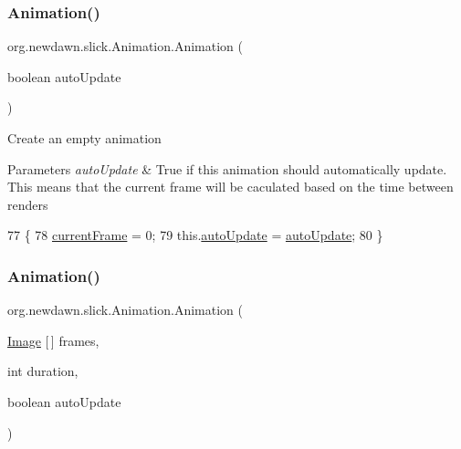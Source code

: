\subsubsection{\texorpdfstring{Animation()}{Animation()}\hspace{0.1cm}{\footnotesize\ttfamily [4/9]}}
{\footnotesize\ttfamily org.\+newdawn.\+slick.\+Animation.\+Animation (\begin{DoxyParamCaption}\item[{boolean}]{auto\+Update }\end{DoxyParamCaption})\hspace{0.3cm}{\ttfamily [inline]}}

Create an empty animation


\begin{DoxyParams}{Parameters}
{\em auto\+Update} & True if this animation should automatically update. This means that the current frame will be caculated based on the time between renders \\
\hline
\end{DoxyParams}

\begin{DoxyCode}
77                                          \{
78         \mbox{\hyperlink{classorg_1_1newdawn_1_1slick_1_1_animation_a358e1f2b9d9a05f83a416405e6bcd332}{currentFrame}} = 0;
79         this.\mbox{\hyperlink{classorg_1_1newdawn_1_1slick_1_1_animation_a343dbff14a050cf8753e9a67746deede}{autoUpdate}} = \mbox{\hyperlink{classorg_1_1newdawn_1_1slick_1_1_animation_a343dbff14a050cf8753e9a67746deede}{autoUpdate}};
80     \}
\end{DoxyCode}
\mbox{\label{classorg_1_1newdawn_1_1slick_1_1_animation_a63906cb218e07821618b28ba434690d2}} 
\subsubsection{\texorpdfstring{Animation()}{Animation()}\hspace{0.1cm}{\footnotesize\ttfamily [5/9]}}
{\footnotesize\ttfamily org.\+newdawn.\+slick.\+Animation.\+Animation (\begin{DoxyParamCaption}\item[{\mbox{\hyperlink{classorg_1_1newdawn_1_1slick_1_1_image}{Image}} \mbox{[}$\,$\mbox{]}}]{frames,  }\item[{int}]{duration,  }\item[{boolean}]{auto\+Update }\end{DoxyParamCaption})\hspace{0.3cm}{\ttfamily [inline]}}


